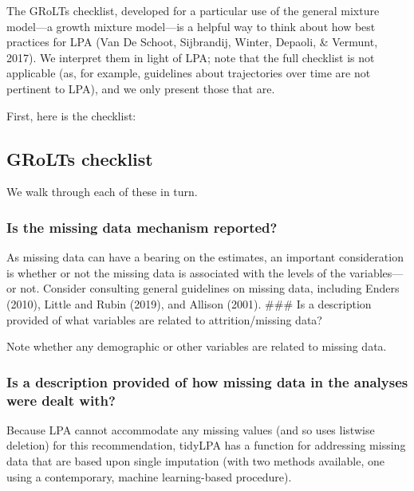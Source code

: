 \documentclass[english,man]{apa6}
\begin{document}
The GRoLTs checklist, developed for a particular use of the general mixture
model---a growth mixture model---is a helpful way to think about how best
practices for LPA (Van De Schoot, Sijbrandij, Winter, Depaoli, \& Vermunt, 2017). We interpret them in light of LPA; note that
the full checklist is not applicable (as, for example, guidelines about
trajectories over time are not pertinent to LPA), and we only present those that
are.

First, here is the checklist:

\hypertarget{grolts-checklist}{%
\subsection{GRoLTs checklist}\label{grolts-checklist}}

\hypertarget{htmlwidget-fffc7926638efd89a6a8}{}

We walk through each of these in turn.

\hypertarget{is-the-missing-data-mechanism-reported}{%
\subsubsection{Is the missing data mechanism reported?}\label{is-the-missing-data-mechanism-reported}}

As missing data can have a bearing on the estimates, an important consideration is whether or not the missing data is associated with the levels of the variables---or not. Consider consulting general guidelines on missing data, including Enders (2010), Little and Rubin (2019), and Allison (2001).
\#\#\# Is a description provided of what variables are related to attrition/missing data?

Note whether any demographic or other variables are related to missing data.

\hypertarget{is-a-description-provided-of-how-missing-data-in-the-analyses-were-dealt-with}{%
\subsubsection{Is a description provided of how missing data in the analyses were dealt with?}\label{is-a-description-provided-of-how-missing-data-in-the-analyses-were-dealt-with}}

Because LPA cannot accommodate any missing values (and so uses listwise deletion) for this recommendation, tidyLPA has a function for addressing missing data that are based upon single imputation (with two methods available, one using a contemporary, machine learning-based procedure).
\end{document}
